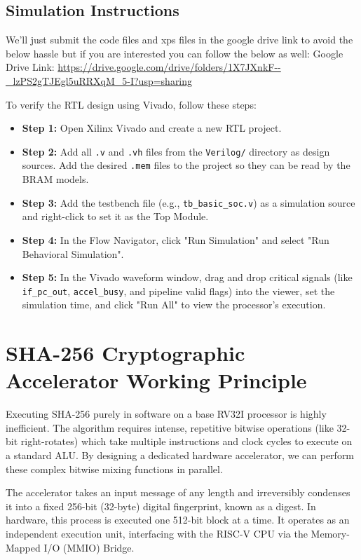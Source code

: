 \documentclass[11pt,a4paper]{article}
\begin{document}
\subsection{Simulation Instructions}
We'll just submit the code files and xps files in the google drive link to avoid the below hassle but if you are interested you can follow the below as well: 
Google Drive Link: \url{https://drive.google.com/drive/folders/1X7JXnkF--_lzPS2gTJEgl5uRRXqM_5-I?usp=sharing}

To verify the RTL design using Vivado, follow these steps: 
\begin{itemize}
    \item \textbf{Step 1:} Open Xilinx Vivado and create a new RTL project. %
    \item \textbf{Step 2:} Add all \texttt{.v} and \texttt{.vh} files from the \texttt{Verilog/} directory as design sources. Add the desired \texttt{.mem} files to the project so they can be read by the BRAM models. %
    \item \textbf{Step 3:} Add the testbench file (e.g., \texttt{tb\_basic\_soc.v}) as a simulation source and right-click to set it as the Top Module. %
    \item \textbf{Step 4:} In the Flow Navigator, click "Run Simulation" and select "Run Behavioral Simulation". %
    \item \textbf{Step 5:} In the Vivado waveform window, drag and drop critical signals (like \texttt{if\_pc\_out}, \texttt{accel\_busy}, and pipeline valid flags) into the viewer, set the simulation time, and click "Run All" to view the processor's execution. %
\end{itemize}

\section{SHA-256 Cryptographic Accelerator Working Principle}

Executing SHA-256 purely in software on a base RV32I processor is highly inefficient. %
The algorithm requires intense, repetitive bitwise operations (like 32-bit right-rotates) which take multiple instructions and clock cycles to execute on a standard ALU. %
By designing a dedicated hardware accelerator, we can perform these complex bitwise mixing functions in parallel. %

The accelerator takes an input message of any length and irreversibly condenses it into a fixed 256-bit (32-byte) digital fingerprint, known as a digest. %
In hardware, this process is executed one 512-bit block at a time. %
It operates as an independent execution unit, interfacing with the RISC-V CPU via the Memory-Mapped I/O (MMIO) Bridge. %
\end{document}
